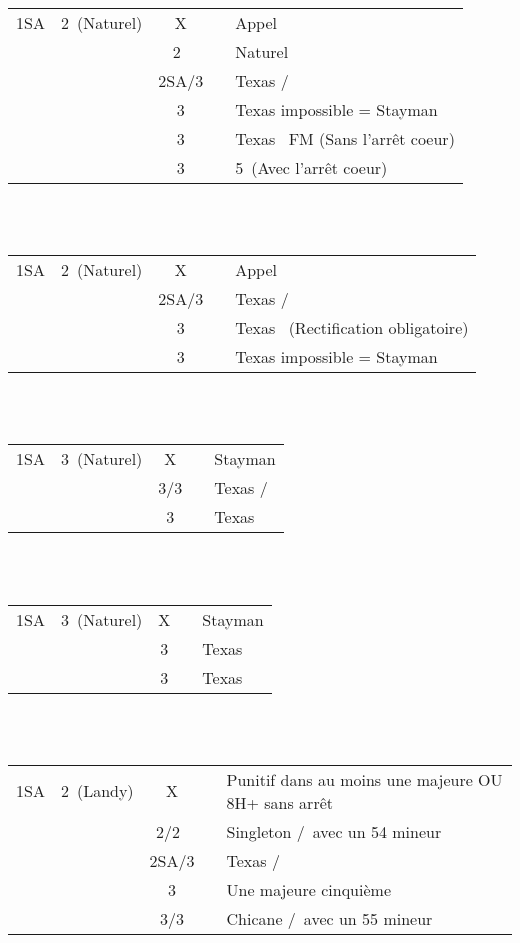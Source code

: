 \documentclass[a4paper, oneside, 11pt]{report}
\begin{document}
		\begin{tabular}{cccc|l}
		1SA & 2\coeur\ (Naturel) & X && Appel\\
		&& 2\pique\ && Naturel\\
		&& 2SA/3\trefle && Texas \trefle/\carreau\\
		&& 3\carreau && Texas impossible = Stayman\\
		&& 3\coeur && Texas \pique\ FM (Sans l'arrêt coeur)\\
		&& 3\pique && 5\pique\ (Avec l'arrêt coeur)\\
		\end{tabular}\\\\

		\begin{tabular}{cccc|l}
		1SA & 2\pique\ (Naturel) & X && Appel\\
		&& 2SA/3\trefle && Texas \trefle/\carreau\\
		&& 3\carreau && Texas \coeur\ (Rectification obligatoire)\\
		&& 3\coeur && Texas impossible = Stayman\\
		\end{tabular}\\\\

		\begin{tabular}{cccc|l}
		1SA & 3\trefle\ (Naturel) & X && Stayman\\
		&& 3\carreau/3\coeur && Texas \coeur/\pique\\
		&& 3\pique && Texas \carreau\\
		\end{tabular}\\\\

		\begin{tabular}{cccc|l}
		1SA & 3\carreau\ (Naturel) & X && Stayman\\
		&& 3\coeur && Texas \pique\\
		&& 3\pique && Texas \coeur\\
		\end{tabular}\\\\

		\begin{tabular}{cccc|l}
		1SA & 2\trefle\ (Landy) & X && Punitif dans au moins une majeure OU 8H+ sans arrêt\\
		&& 2\coeur/2\pique\ && Singleton \coeur/\pique\ avec un 54 mineur\\
		&& 2SA/3\trefle && Texas \trefle/\carreau\\
		&& 3\carreau && Une majeure cinquième\\
		&& 3\coeur/3\pique && Chicane \coeur/\pique\ avec un 55 mineur\\
		\end{tabular}\\\\
\end{document}
